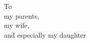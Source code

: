 \documentclass[12pt]{book}
\begin{document}
\begin{singlespacing}\phantom{}\par\phantom{}\par\phantom{}\par\phantom{}\par\phantom{}\par\phantom{}\par\phantom{}\par\phantom{}\par\phantom{}\par\phantom{}\par\phantom{}\par\phantom{}\par\phantom{}\par\phantom{}\par\phantom{}\par\phantom{}\par\phantom{}\par\phantom{}\par\phantom{}\par\phantom{}

{\centering\large To\\my parents,\\my wife,\\and especially my daughter \par}

\phantom{}\par\phantom{}\par\phantom{}\par\phantom{}\par\phantom{}\par\phantom{}\par\phantom{}\par\phantom{}\par\phantom{}\par\phantom{}\par\phantom{}\par\phantom{}\par\phantom{}\par\phantom{}\par\phantom{}\par\phantom{}\par\phantom{}\par\phantom{}\par\phantom{}\par\phantom{}\par\end{singlespacing}
\setcounter{page}{4}\clearpage\phantom{}\setcounter{page}{0}\clearpage
\end{document}
